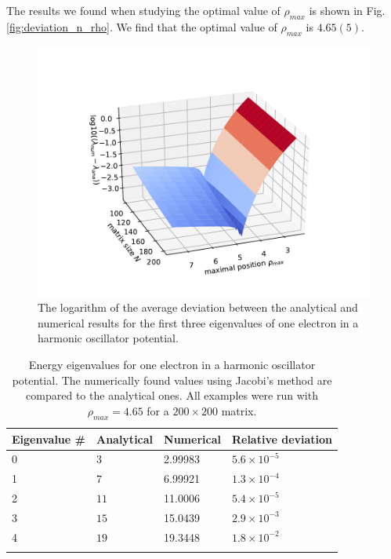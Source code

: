 \documentclass[%
 reprint,
nofootinbib,
aps,
]{revtex4-1}
\begin{document}
The results we found when studying the optimal value of $\rho_{max}$ is shown in Fig. \vref{fig:deviation_n_rho}. We find that the optimal value of $\rho_{max}$ is $4.65(5)$.
\par

\begin{figure}
\centering
\includegraphics[scale=0.5]{../figures/rho_vs_n.pdf}
\caption{The logarithm of the average deviation between the analytical and numerical results for the first three eigenvalues of one electron in a harmonic oscillator potential.}
\label{fig:deviation_n_rho}
\end{figure}

\begin{table}[]
\caption{Energy eigenvalues for one electron in a harmonic oscillator potential. The numerically found values using Jacobi's method are compared to the analytical ones. All examples were run with $\rho_{max}=4.65$ for a $200\times 200$ matrix.}
\begin{tabular}{@{}llll@{}}
\toprule
Eigenvalue \# & Analytical & Numerical & Relative deviation\\ \midrule
0     & $3$       & 2.99983  &  $5.6\times10^{-5}$    \\
1     & $7$       & 6.99921  &  $1.3\times10^{-4}$   \\
2     & $11$      & 11.0006  &  $5.4\times10^{-5}$ \\
3     & $15$      & 15.0439  &  $2.9\times10^{-3}$   \\
4     & $19$      & 19.3448  &  $1.8\times10^{-2}$   \\
\botrule
\end{tabular}
\label{table:one_ele}
\end{table}
\end{document}
